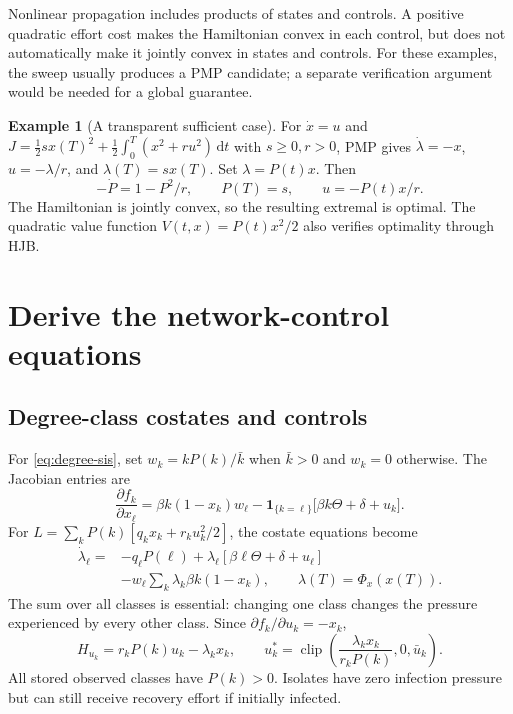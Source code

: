 \documentclass[11pt,a4paper]{article}
\newcommand{\dd}{\,\mathrm{d}}
\DeclareMathOperator{\clip}{clip}
\theoremstyle{definition}
\newtheorem{example}[proposition]{Example}
\theoremstyle{remark}
\begin{document}
Nonlinear propagation includes products of states and controls. A positive quadratic effort cost makes the Hamiltonian convex in each control, but does not automatically make it jointly convex in states and controls. For these examples, the sweep usually produces a PMP candidate; a separate verification argument would be needed for a global guarantee.

\begin{example}[A transparent sufficient case]
For $\dot x=u$ and
$J=\tfrac12 s x(T)^2+\tfrac12\int_0^T(x^2+r u^2)\dd t$ with $s\ge0,r>0$,
PMP gives $\dot\lambda=-x$, $u=-\lambda/r$, and $\lambda(T)=sx(T)$.
Set $\lambda=P(t)x$. Then
\[
-\dot P=1-P^2/r,\qquad P(T)=s,\qquad u=-P(t)x/r.
\]
The Hamiltonian is jointly convex, so the resulting extremal is optimal. The quadratic value function $V(t,x)=P(t)x^2/2$ also verifies optimality through HJB.
\end{example}

\section{Derive the network-control equations}
\subsection{Degree-class costates and controls}
For \eqref{eq:degree-sis}, set $w_k=kP(k)/\bar k$ when $\bar k>0$ and $w_k=0$ otherwise. The Jacobian entries are
\begin{equation}
\frac{\partial f_k}{\partial x_\ell}
=\beta k(1-x_k)w_\ell
-\mathbf1_{\{k=\ell\}}\big[\beta k\Theta+\delta+u_k\big].
\label{eq:degree-jacobian}
\end{equation}
For $L=\sum_kP(k)[q_kx_k+r_ku_k^2/2]$, the costate equations become
\begin{align}
\dot\lambda_\ell={}&-q_\ell P(\ell)
+\lambda_\ell[\beta\ell\Theta+\delta+u_\ell]\nonumber\\
&-w_\ell\sum_k\lambda_k\beta k(1-x_k),
\qquad \lambda(T)=\Phi_x(x(T)).
\label{eq:degree-adjoint}
\end{align}
The sum over all classes is essential: changing one class changes the pressure experienced by every other class. Since $\partial f_k/\partial u_k=-x_k$,
\begin{equation}
H_{u_k}=r_kP(k)u_k-\lambda_kx_k,
\qquad
u_k^*=\clip\left(\frac{\lambda_kx_k}{r_kP(k)},0,\bar u_k\right).
\label{eq:degree-update}
\end{equation}
All stored observed classes have $P(k)>0$. Isolates have zero infection pressure but can still receive recovery effort if initially infected.
\end{document}
